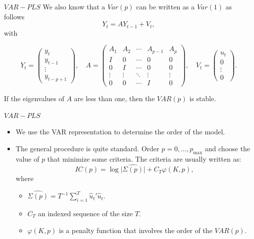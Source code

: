 \documentclass{beamer}
\newcommand{\?}{?`}
\begin{document}
\begin{frame}{$VAR-PLS$}
  We also know that a $Var(p)$ can be written as a $Var(1)$ as follows
    \begin{displaymath}
      Y_t=AY_{t-1} + V_t,
    \end{displaymath}
    with
    \begin{small}
    \begin{displaymath}
      Y_t=\left(
        \begin{array}{c}
          y_t \\
          y_{t-1} \\
          \vdots \\
          y_{t-p+1}
        \end{array}
        \right), \quad
        A=\left(
        \begin{array}{ccccc}
          A_1 & A_2 & \cdots & A_{p-1} & A_p \\
          I & 0 & \cdots & 0 & 0 \\
          0 & I & \cdots & 0 & 0 \\
          \vdots & \vdots & \ddots & \vdots & \vdots \\
          0 & 0 & \cdots & I & 0
        \end{array}
        \right), \quad
        V_t=\left(
        \begin{array}{c}
          u_t \\
          0 \\
          \vdots \\
          0
        \end{array}
        \right).
    \end{displaymath}
    \end{small}
   If the eigenvalues of  $A$ are less than one, then the $VAR(p)$ is stable.
\end{frame}

\begin{frame}{$VAR-PLS$}
  \begin{itemize}
  \item We use the VAR representation to determine the order of the model.

  \item The general procedure is quite standard. Order  $p=0,\ldots,p_{\max}$ and choose the value of $p$ that minimize some criteria.
  The criteria are usually written as:
     \begin{displaymath}
      IC(p)=\log \vert \hat{\Sigma(p)} \vert + C_T \varphi(K,p),
    \end{displaymath}
    where
    \begin{itemize}
      \item $\hat{\Sigma(p)}=T^{-1} \sum_{i=1}^T\hat{u}_t'\hat{u}_t$.
      \item $C_T$ an indexed sequence of the size  $T$.
      \item $\varphi(K,p)$ is a penalty function that involves the order of the $VAR(p)$.
    \end{itemize}
  \end{itemize}
\end{frame}
\end{document}
